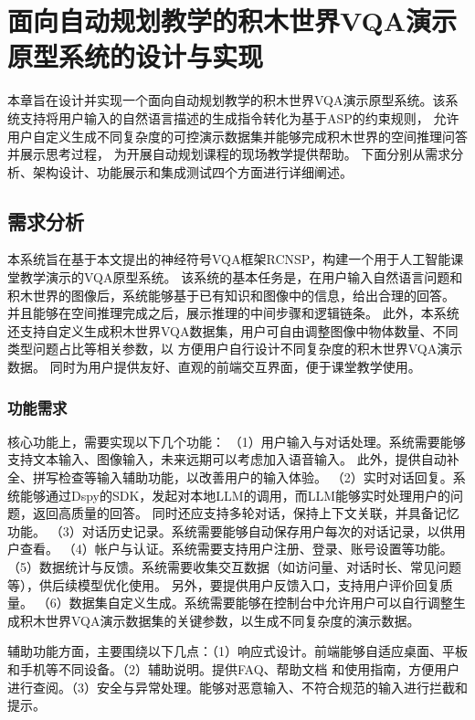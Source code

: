 \chapter{面向自动规划教学的积木世界VQA演示原型系统的设计与实现}
本章旨在设计并实现一个面向自动规划教学的积木世界VQA演示原型系统。该系统支持将用户输入的自然语言描述的生成指令转化为基于ASP的约束规则，
允许用户自定义生成不同复杂度的可控演示数据集并能够完成积木世界的空间推理问答并展示思考过程，
为开展自动规划课程的现场教学提供帮助。
下面分别从需求分析、架构设计、功能展示和集成测试四个方面进行详细阐述。
\section{需求分析}
本系统旨在基于本文提出的神经符号VQA框架RCNSP，构建一个用于人工智能课堂教学演示的VQA原型系统。
该系统的基本任务是，在用户输入自然语言问题和积木世界的图像后，系统能够基于已有知识和图像中的信息，给出合理的回答。
并且能够在空间推理完成之后，展示推理的中间步骤和逻辑链条。
此外，本系统还支持自定义生成积木世界VQA数据集，用户可自由调整图像中物体数量、不同类型问题占比等相关参数，以
方便用户自行设计不同复杂度的积木世界VQA演示数据。
同时为用户提供友好、直观的前端交互界面，便于课堂教学使用。

\subsection{功能需求}
核心功能上，需要实现以下几个功能：
（1）用户输入与对话处理。系统需要能够支持文本输入、图像输入，未来远期可以考虑加入语音输入。
此外，提供自动补全、拼写检查等输入辅助功能，以改善用户的输入体验。
（2）实时对话回复。系统能够通过Dspy的SDK，发起对本地LLM的调用，而LLM能够实时处理用户的问题，返回高质量的回答。
同时还应支持多轮对话，保持上下文关联，并具备记忆功能。
（3）对话历史记录。系统需要能够自动保存用户每次的对话记录，以供用户查看。
（4）帐户与认证。系统需要支持用户注册、登录、账号设置等功能。
（5）数据统计与反馈。系统需要收集交互数据（如访问量、对话时长、常见问题等），供后续模型优化使用。
另外，要提供用户反馈入口，支持用户评价回复质量。
（6）数据集自定义生成。系统需要能够在控制台中允许用户可以自行调整生成积木世界VQA演示数据集的关键参数，以生成不同复杂度的演示数据。

辅助功能方面，主要围绕以下几点：（1）响应式设计。前端能够自适应桌面、平板和手机等不同设备。（2）辅助说明。提供FAQ、帮助文档
和使用指南，方便用户进行查阅。（3）安全与异常处理。能够对恶意输入、不符合规范的输入进行拦截和提示。
